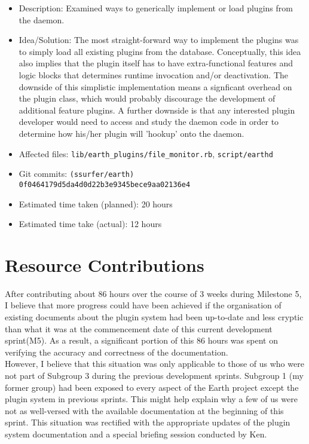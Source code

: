 \begin{itemize}
		\begin{itemize}
	   	\item Description: Examined ways to generically implement or load plugins from the daemon. 
	      \item Idea/Solution: The most straight-forward way to implement the plugins was to simply load all existing plugins from the database. Conceptually, this idea also implies that the plugin itself has to have extra-functional features and logic blocks that determines runtime invocation and/or deactivation. The downside of this simplistic implementation means a signficant overhead on the plugin class, which would probably discourage the development of additional feature plugins. A further downside is that any interested plugin developer would need to access and study the daemon code in order to determine how his/her plugin will 'hookup' onto the daemon.
	      \item Affected files: \texttt{lib/earth\_plugins/file\_monitor.rb}, \texttt{script/earthd}
	      \item Git commits: \texttt{(ssurfer/earth) 0f0464179d5da4d0d22b3e9345bece9aa02136e4}
	      \item Estimated time taken (planned): 20 hours
	      \item Estimated time take (actual): 12 hours
		\end{itemize}
\end{itemize}

\section*{Resource Contributions}

After contributing about 86 hours over the course of 3 weeks during Milestone 5, I believe that more progress could have been achieved
if the organisation of existing documents about the plugin system had been up-to-date and less cryptic than what it was at the commencement
date of this current development sprint(M5). As a result, a significant portion of this 86 hours was spent on verifying the accuracy and
correctness of the documentation. \\

However, I believe that this situation was only applicable to those of us who were not part of Subgroup 3 during the previous development sprints.
Subgroup 1 (my former group) had been exposed to every aspect of the Earth project except the plugin system in previous sprints. This might help explain
why a few of us were not as well-versed with the available documentation at the beginning of this sprint. This situation was rectified with
the appropriate updates of the plugin system documentation and a special briefing session conducted by Ken.


